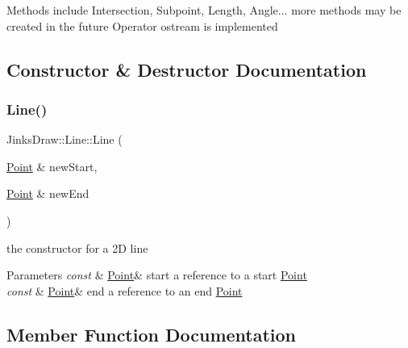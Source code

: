 Methods include Intersection, Subpoint, Length, Angle... more methods may be created in the future Operator ostream is implemented 
\begin{DoxyCode}{0}
\end{DoxyCode}
 

\subsection{Constructor \& Destructor Documentation}
\mbox{\label{class_jinks_draw_1_1_line_a0a01ff362d3d5cb6de257cdc59fdbd7a}} 
\subsubsection{\texorpdfstring{Line()}{Line()}}
{\footnotesize\ttfamily Jinks\+Draw\+::\+Line\+::\+Line (\begin{DoxyParamCaption}\item[{\mbox{\hyperlink{class_jinks_draw_1_1_point}{Point}} \&}]{new\+Start,  }\item[{\mbox{\hyperlink{class_jinks_draw_1_1_point}{Point}} \&}]{new\+End }\end{DoxyParamCaption})}



the constructor for a 2D line 


\begin{DoxyParams}{Parameters}
{\em const} & \mbox{\hyperlink{class_jinks_draw_1_1_point}{Point}}\& start a reference to a start \mbox{\hyperlink{class_jinks_draw_1_1_point}{Point}} \\
\hline
{\em const} & \mbox{\hyperlink{class_jinks_draw_1_1_point}{Point}}\& end a reference to an end \mbox{\hyperlink{class_jinks_draw_1_1_point}{Point}} \\
\hline
\end{DoxyParams}


\subsection{Member Function Documentation}
\mbox{\label{class_jinks_draw_1_1_line_aea73a9418815e5d255044a6dbce37e3e}} 
